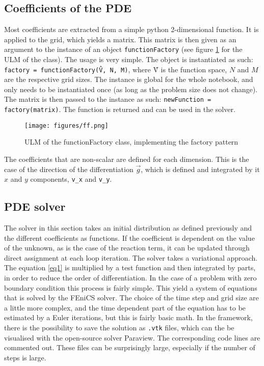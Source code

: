 \documentclass[11pt, oneside]{article}   	%
\begin{document}
\subsection{Coefficients of the PDE}
Most coefficients are extracted from a simple python 2-dimensional function. It is applied to the grid, which yields a matrix. This matrix is then given as an argument to the instance of an object \texttt{functionFactory} (see figure \ref{fig:ff} for the ULM of the class). The usage is very simple. The object is instantiated as such: \texttt{factory = functionFactory(\^{V}, N, M)}, where \^{V} is the function space, $N$ and $M$ are the respective grid sizes. The instance is global for the whole notebook, and only needs to be instantiated once (as long as the problem size does not change). The matrix is then passed to the instance as such: \texttt{newFunction = factory(matrix)}. The function is returned and can be used in the solver.
\begin{figure}[h]
\centering
\texttt{[image: figures/ff.png]}
\caption{ULM of the functionFactory class, implementing the factory pattern}
\label{fig:ff}
\end{figure}

The coefficients that are non-scalar are defined for each dimension. This is the case of the direction of the differentiation $\vec{g}$, which is defined and integrated by it $x$ and $y$ components, \texttt{v\_x} and \texttt{v\_y}.
\subsection{PDE solver}
The solver in this section takes an initial distribution as defined previously and the different coefficients  as functions. If the coefficient is dependent on the value of the unknown, as is the case of the reaction term, it can be updated through direct assignment at each loop iteration. 
The solver takes a variational approach. The equation \ref{eq1} is multiplied by a test function and then integrated by parts, in order to reduce the order of differentiation. In the case of a problem with zero boundary condition this process is fairly simple. This yield a system of equations that is solved by the FEniCS solver. The choice of the time step and grid size are a little more complex, and the time dependent part of the equation has to be estimated by a Euler iterations, but this is fairly basic math. \newline
In the framework, there is the possibility to save the solution as \texttt{.vtk} files, which can the be visualised with the open-source solver Paraview. The corresponding code lines are commented out. These files can be surprisingly large, especially if the number of steps is large. 
\end{document}
